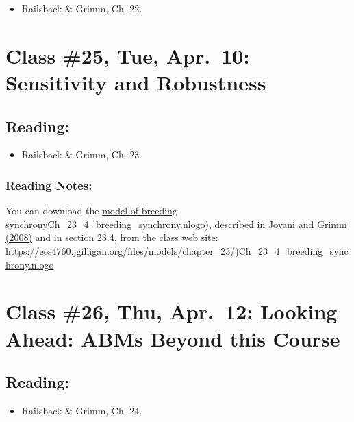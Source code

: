 \documentclass[]{article}
\providecommand{\tightlist}{%
  \setlength{\itemsep}{0pt}\setlength{\parskip}{0pt}}
\begin{document}
\begin{itemize}
\tightlist
\item
  Railsback \& Grimm, Ch. 22.
\end{itemize}

\hypertarget{class-25-tue-apr.10-sensitivity-and-robustness}{%
\section{Class \#25, Tue, Apr.~10: Sensitivity and
Robustness}\label{class-25-tue-apr.10-sensitivity-and-robustness}}

\hypertarget{reading-24}{%
\subsection{Reading:}\label{reading-24}}

\begin{itemize}
\tightlist
\item
  Railsback \& Grimm, Ch. 23.
\end{itemize}

\hypertarget{reading-notes-18}{%
\subsubsection{Reading Notes:}\label{reading-notes-18}}

You can download the \href{/files/models/chapter_23/}{model of breeding
synchrony}Ch\_23\_4\_breeding\_synchrony.nlogo), described in
\href{/files/models/chapter_05/Jovani_Grimm_2008_Breeding.pdf}{Jovani
and Grimm (2008)} and in section 23.4, from the class web site:
\url{https://ees4760.jgilligan.org/files/models/chapter_23/)Ch_23_4_breeding_synchrony.nlogo}

\hypertarget{class-26-thu-apr.12-looking-ahead-abms-beyond-this-course}{%
\section{Class \#26, Thu, Apr.~12: Looking Ahead: ABMs Beyond this
Course}\label{class-26-thu-apr.12-looking-ahead-abms-beyond-this-course}}

\hypertarget{reading-25}{%
\subsection{Reading:}\label{reading-25}}

\begin{itemize}
\tightlist
\item
  Railsback \& Grimm, Ch. 24.
\end{itemize}
\end{document}
